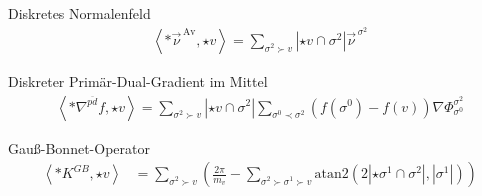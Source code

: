 \documentclass[handout]{beamer}
\newcommand{\vecover}[2]{\vec{#1}^{\,#2}}
\newcommand{\av}{\text{Av}}
\begin{document}
  \begin{frame}
    \begin{block}{Diskretes Normalenfeld}
        \begin{align*}
          \left\langle *\vecover{\nu}{\av}, \star v \right\rangle = \sum_{\sigma^{2}\succ v} \left| \star v \cap \sigma^{2}\right| 
                                          \vecover{\nu}{\sigma^{2}}
        \end{align*}
    \end{block}
    \pause
    \begin{block}{Diskreter Primär-Dual-Gradient im Mittel}
      \begin{align*}
        \left\langle *\nabla^{\overline{pd}} f, \star v \right\rangle
            = \sum_{\sigma^{2}\succ v} \left| \star v \cap \sigma^{2} \right|
                 \sum_{\sigma^{0}\prec\sigma^{2}} \left( f(\sigma^{0}) - f(v) \right) \nabla\Phi_{\sigma^{0}}^{\sigma^{2}}
      \end{align*}
    \end{block}
     \pause
    \begin{block}{Gauß-Bonnet-Operator}
       \begin{align*}
      \label{eqProbGB}
      \left\langle *K^{GB} , \star v \right\rangle &=
          \sum_{\sigma^{2}\succ v} \left( \frac{2\pi}{m_{v}} - \sum_{\sigma^{2}\succ\sigma^{1}\succ v}
                               \text{atan2}\left( 2\left|\star\sigma^{1} \cap \sigma^{2} \right|, 
                                 \left|\sigma^{1}\right|\right) \right)
    \end{align*}
    \end{block}
  \end{frame}
\end{document}
